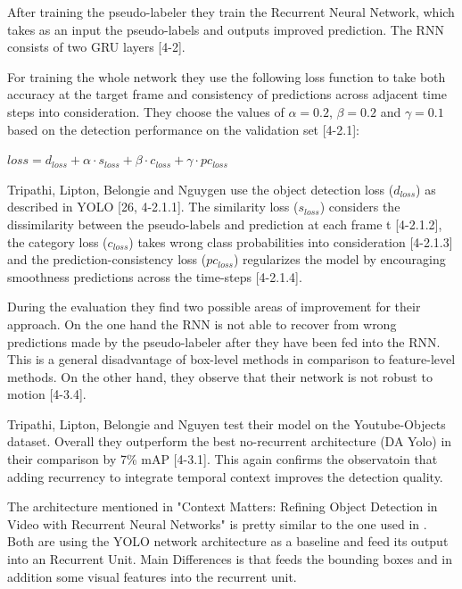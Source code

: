 \documentclass[conference]{IEEEtran}
\begin{document}
After training the pseudo-labeler they train the Recurrent Neural Network, which takes as an input the pseudo-labels and outputs improved prediction. The RNN consists of two GRU layers [4-2]. \newline

For training the whole network they use the following loss function to take both accuracy at the target frame and consistency of predictions across adjacent time steps into consideration. They choose the values of $\alpha = 0.2$, $\beta = 0.2$ and $\gamma = 0.1$ based on the detection performance on the validation set [4-2.1]: \newline

$ loss = d_{loss} + \alpha \cdot s_{loss} + \beta \cdot c_{loss} + \gamma \cdot pc_{loss} $ \newline

Tripathi, Lipton, Belongie and Nguygen use the object detection loss ($d_{loss}$) as described in YOLO [26, 4-2.1.1]. The similarity loss ($s_{loss}$) considers the dissimilarity between the pseudo-labels and prediction at each frame t [4-2.1.2], the category loss ($c_{loss}$) takes wrong class probabilities into consideration [4-2.1.3] and the prediction-consistency loss ($pc_{loss}$) regularizes the model by encouraging smoothness predictions across the time-steps [4-2.1.4]. \newline

During the evaluation they find two possible areas of improvement for their approach. On the one hand the RNN is not able to recover from wrong predictions made by the pseudo-labeler after they have been fed into the RNN. This is a general disadvantage of box-level methods in comparison to feature-level methods. On the other hand, they observe that their network is not robust to motion [4-3.4]. \newline

Tripathi, Lipton, Belongie and Nguyen test their model on the Youtube-Objects dataset. Overall they outperform the best no-recurrent architecture (DA Yolo) in their comparison by 7\% mAP [4-3.1]. This again confirms the observatoin that adding recurrency to integrate temporal context improves the detection quality.  \newline

The architecture mentioned in "Context Matters: Refining Object Detection in Video with Recurrent Neural Networks" is pretty similar to the one used in \cite{b4}. Both are using the YOLO network architecture as a baseline and feed its output into an Recurrent Unit. Main Differences is that \cite{b4} feeds the bounding boxes and in addition some visual features into the recurrent unit.  
\end{document}
